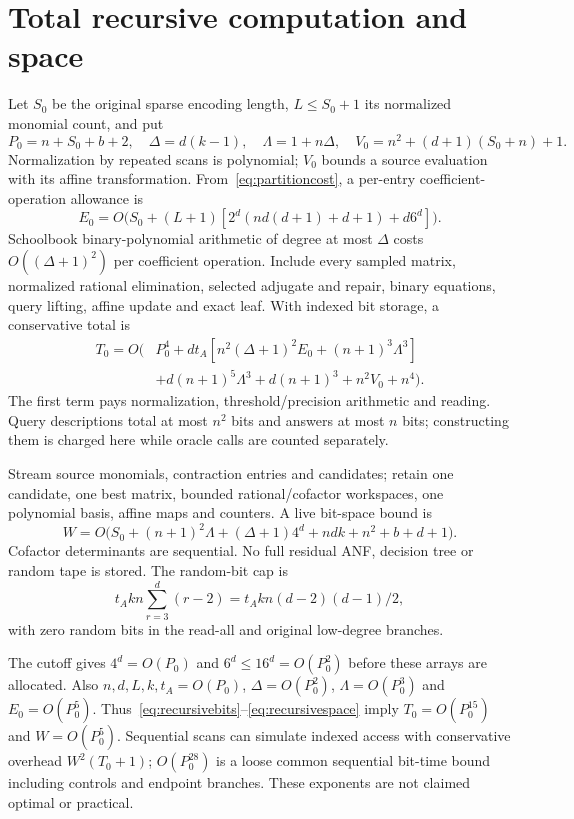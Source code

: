\documentclass[11pt]{article}
\theoremstyle{remark}\newtheorem{remark}[theorem]{Remark}
\begin{document}
\section{Total recursive computation and space}\label{sec:resources}
Let $S_0$ be the original sparse encoding length, $L\le S_0+1$ its normalized monomial count, and put
\[
 P_0=n+S_0+b+2,\quad \Delta=d(k-1),\quad \Lambda=1+n\Delta,
 \quad V_0=n^2+(d+1)(S_0+n)+1.
\]
Normalization by repeated scans is polynomial; $V_0$ bounds a source evaluation with its affine transformation. From~\eqref{eq:partitioncost}, a per-entry coefficient-operation allowance is
\[
 E_0=O\bigl(S_0+(L+1)[2^d(nd(d+1)+d+1)+d6^d]\bigr).
\]
Schoolbook binary-polynomial arithmetic of degree at most $\Delta$ costs $O((\Delta+1)^2)$ per coefficient operation. Include every sampled matrix, normalized rational elimination, selected adjugate and repair, binary equations, query lifting, affine update and exact leaf. With indexed bit storage, a conservative total is
\begin{align}
 T_0=O\bigl(&P_0^4+dt_A[n^2(\Delta+1)^2E_0+(n+1)^3\Lambda^3]\label{eq:recursivebits}\\
 &+d(n+1)^5\Lambda^3+d(n+1)^3+n^2V_0+n^4\bigr).\nonumber
\end{align}
The first term pays normalization, threshold/precision arithmetic and reading. Query descriptions total at most $n^2$ bits and answers at most $n$ bits; constructing them is charged here while oracle calls are counted separately.

Stream source monomials, contraction entries and candidates; retain one candidate, one best matrix, bounded rational/cofactor workspaces, one polynomial basis, affine maps and counters. A live bit-space bound is
\begin{equation}\label{eq:recursivespace}
 W=O\bigl(S_0+(n+1)^2\Lambda+(\Delta+1)4^d+ndk+n^2+b+d+1\bigr).
\end{equation}
Cofactor determinants are sequential. No full residual ANF, decision tree or random tape is stored. The random-bit cap is
\[
 t_Akn\sum_{r=3}^d(r-2)=t_Akn(d-2)(d-1)/2,
\]
with zero random bits in the read-all and original low-degree branches.

The cutoff gives $4^d=O(P_0)$ and $6^d\le16^d=O(P_0^2)$ before these arrays are allocated. Also $n,d,L,k,t_A=O(P_0)$, $\Delta=O(P_0^2)$, $\Lambda=O(P_0^3)$ and $E_0=O(P_0^5)$. Thus~\eqref{eq:recursivebits}--\eqref{eq:recursivespace} imply $T_0=O(P_0^{15})$ and $W=O(P_0^5)$. Sequential scans can simulate indexed access with conservative overhead $W^2(T_0+1)$; $O(P_0^{28})$ is a loose common sequential bit-time bound including controls and endpoint branches. These exponents are not claimed optimal or practical.
\end{document}

